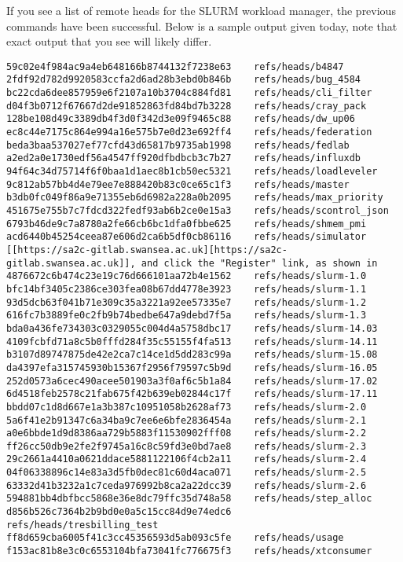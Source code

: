 \documentclass[11pt]{article}
\begin{document}
If you see a list of remote heads for the SLURM workload manager, the previous
commands have been successful. Below is a sample output given today, note that
exact output that you see will likely differ.

\begin{verbatim}
59c02e4f984ac9a4eb648166b8744132f7238e63	refs/heads/b4847
2fdf92d782d9920583ccfa2d6ad28b3ebd0b846b	refs/heads/bug_4584
bc22cda6dee857959e6f2107a10b3704c884fd81	refs/heads/cli_filter
d04f3b0712f67667d2de91852863fd84bd7b3228	refs/heads/cray_pack
128be108d49c3389db4f3d0f342d3e09f9465c88	refs/heads/dw_up06
ec8c44e7175c864e994a16e575b7e0d23e692ff4	refs/heads/federation
beda3baa537027ef77cfd43d65817b9735ab1998	refs/heads/fedlab
a2ed2a0e1730edf56a4547ff920dfbdbcb3c7b27	refs/heads/influxdb
94f64c34d75714f6f0baa1d1aec8b1cb50ec5321	refs/heads/loadleveler
9c812ab57bb4d4e79ee7e888420b83c0ce65c1f3	refs/heads/master
b3db0fc049f86a9e71355eb6d6982a228a0b2095	refs/heads/max_priority
451675e755b7c7fdcd322fedf93ab6b2ce0e15a3	refs/heads/scontrol_json
6793b46de9c7a8780a2fe66cb6bc1dfa0fbbe625	refs/heads/shmem_pmi
acd6440b45254ceea87e606d2ca6b5df0cb86116	refs/heads/simulator
[[https://sa2c-gitlab.swansea.ac.uk][https://sa2c-gitlab.swansea.ac.uk]], and click the "Register" link, as shown in
4876672c6b474c23e19c76d666101aa72b4e1562	refs/heads/slurm-1.0
bfc14bf3405c2386ce303fea08b67dd4778e3923	refs/heads/slurm-1.1
93d5dcb63f041b71e309c35a3221a92ee57335e7	refs/heads/slurm-1.2
616fc7b3889fe0c2fb9b74bedbe647a9debd7f5a	refs/heads/slurm-1.3
bda0a436fe734303c0329055c004d4a5758dbc17	refs/heads/slurm-14.03
4109fcbfd71a8c5b0fffd284f35c55155f4fa513	refs/heads/slurm-14.11
b3107d89747875de42e2ca7c14ce1d5dd283c99a	refs/heads/slurm-15.08
da4397efa315745930b15367f2956f79597c5b9d	refs/heads/slurm-16.05
252d0573a6cec490acee501903a3f0af6c5b1a84	refs/heads/slurm-17.02
6d4518feb2578c21fab675f42b639eb02844c17f	refs/heads/slurm-17.11
bbdd07c1d8d667e1a3b387c10951058b2628af73	refs/heads/slurm-2.0
5a6f41e2b91347c6a34ba9c7ee6e6bfe2836454a	refs/heads/slurm-2.1
a0e6bbde1d9d8386aa729b5883f11530902fff08	refs/heads/slurm-2.2
ff26cc50db9e2fe2f9745a16c8c59fd3e0bd7ae8	refs/heads/slurm-2.3
29c2661a4410a0621ddace5881122106f4cb2a11	refs/heads/slurm-2.4
04f06338896c14e83a3d5fb0dec81c60d4aca071	refs/heads/slurm-2.5
63332d41b3232a1c7ceda976992b8ca2a22dcc39	refs/heads/slurm-2.6
594881bb4dbfbcc5868e36e8dc79ffc35d748a58	refs/heads/step_alloc
d856b526c7364b2b9bd0e0a5c15cc84d9e74edc6	refs/heads/tresbilling_test
ff8d659cba6005f41c3cc45356593d5ab093c5fe	refs/heads/usage
f153ac81b8e3c0c6553104bfa73041fc776675f3	refs/heads/xtconsumer
\end{verbatim}
\end{document}
